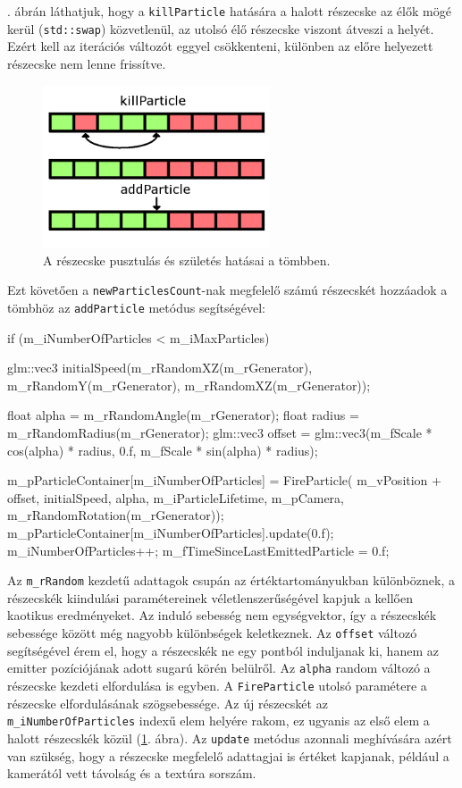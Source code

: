. ábrán láthatjuk, hogy a \texttt{killParticle} hatására a halott részecske az élők mögé kerül (\texttt{std::swap}) közvetlenül, az utolsó élő részecske viszont átveszi a helyét. Ezért kell az iterációs változót eggyel csökkenteni, különben az előre helyezett részecske nem lenne frissítve.
\begin{figure}[h]
 \centering
 \includegraphics[width=0.6\textwidth]{kepek/particleArray.png}
 \caption{A részecske pusztulás és születés hatásai a tömbben.}
 \label{fig:particleArray}
\end{figure}

Ezt követően a \texttt{newParticlesCount}-nak megfelelő számú részecskét hozzáadok a tömbhöz az \texttt{addParticle} metódus segítségével:
\begin{cpp}
if (m_iNumberOfParticles < m_iMaxParticles) {
glm::vec3 initialSpeed(m_rRandomXZ(m_rGenerator), 
	m_rRandomY(m_rGenerator), m_rRandomXZ(m_rGenerator));

float alpha = m_rRandomAngle(m_rGenerator);
float radius = m_rRandomRadius(m_rGenerator);
glm::vec3 offset = glm::vec3(m_fScale * cos(alpha) * radius, 
	0.f, m_fScale * sin(alpha) * radius);
		
m_pParticleContainer[m_iNumberOfParticles] = FireParticle(
	m_vPosition + offset, initialSpeed, alpha, m_iParticleLifetime, 
	m_pCamera, m_rRandomRotation(m_rGenerator));
m_pParticleContainer[m_iNumberOfParticles].update(0.f);
m_iNumberOfParticles++;
m_fTimeSinceLastEmittedParticle = 0.f;
}
\end{cpp}
Az \texttt{m\_rRandom} kezdetű adattagok csupán az értéktartományukban különböznek, a részecskék kiindulási paramétereinek véletlenszerűségével kapjuk a kellően kaotikus eredményeket. Az induló sebesség nem egységvektor, így a részecskék sebessége között még nagyobb különbségek keletkeznek. Az \texttt{offset} változó segítségével érem el, hogy a részecskék ne egy pontból induljanak ki, hanem az emitter pozíciójának adott sugarú körén belülről. Az \texttt{alpha} random változó a részecske kezdeti elfordulása is egyben. A \texttt{FireParticle} utolsó paramétere a részecske elfordulásának szögsebessége. Az új részecskét az \texttt{m\_iNumberOfParticles} indexű elem helyére rakom, ez ugyanis az első elem a halott részecskék közül (\ref{fig:particleArray}. ábra). Az \texttt{update} metódus azonnali meghívására azért van szükség, hogy a részecske megfelelő adattagjai is értéket kapjanak, például a kamerától vett távolság és a textúra sorszám.

